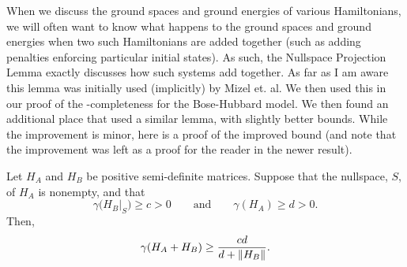 \documentclass[../thesis-main/thesis-main]{subfiles}
\begin{document}
When we discuss the ground spaces and ground energies of various Hamiltonians, we will often want to know what happens to the ground spaces and ground energies when two such Hamiltonians are added together (such as adding penalties enforcing particular initial states).  As such, the Nullspace Projection Lemma exactly discusses how such systems add together.  As far as I am aware this lemma was initially used (implicitly) by Mizel et. al.  
We then used this in our proof of the \QMA-completeness for the Bose-Hubbard model.  We then found an additional place that used a similar lemma, with slightly better bounds.  While the improvement is minor, here is a proof of the improved bound (and note that the improvement was left as a proof for the reader in the newer result).
\begin{lemma}
Let $H_A$ and $H_B$ be positive semi-definite matrices.  Suppose that the nullspace, $S$, of $H_A$ is nonempty, and that 
\begin{equation}
  \gamma\big(H_B|_S\big) \geq c > 0 \qquad \text{and} \qquad \gamma(H_A) \geq d > 0.
\end{equation}
Then,
\begin{equation}
  \gamma(H_A + H_B) \geq \frac{c d}{d + \|{H_B}\|} .
\end{equation}
\end{lemma}
\end{document}
